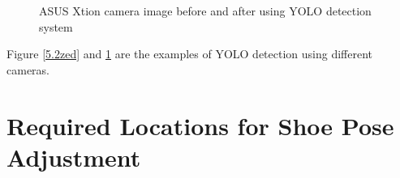 \begin{figure}[H]
\centering
{}
\caption{ASUS Xtion camera image before and after using YOLO detection system}
\label{5.2asus}
\end{figure}

Figure \ref{5.2zed} and \ref{5.2asus} are the examples of YOLO detection using different cameras.



\section{Required Locations for Shoe Pose Adjustment} \label{shoeadjust}

